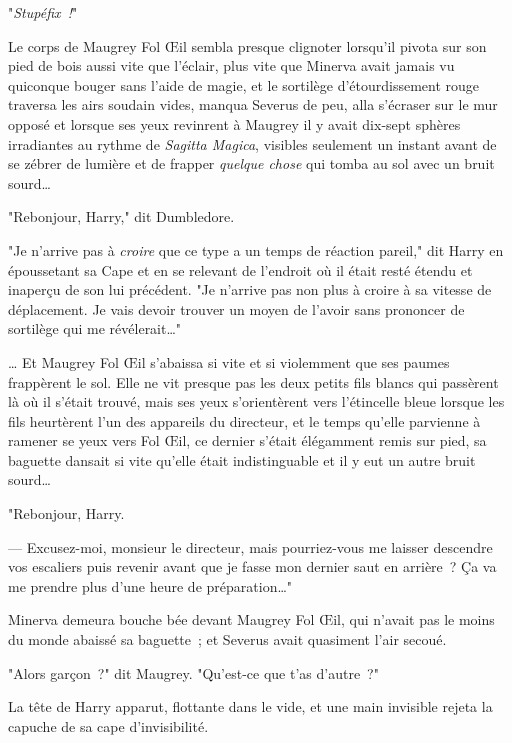 "\emph{Stupéfix~!}"

Le corps de Maugrey Fol Œil sembla presque clignoter lorsqu'il pivota sur son pied de bois aussi vite que l'éclair, plus vite que Minerva avait jamais vu quiconque bouger sans l'aide de magie, et le sortilège d'étourdissement rouge traversa les airs soudain vides, manqua Severus de peu, alla s'écraser sur le mur opposé et lorsque ses yeux revinrent à Maugrey il y avait dix-sept sphères irradiantes au rythme de \emph{Sagitta Magica}, visibles seulement un instant avant de se zébrer de lumière et de frapper \emph{quelque chose} qui tomba au sol avec un bruit sourd…

\later

"Rebonjour, Harry," dit Dumbledore.

"Je n'arrive pas à \emph{croire} que ce type a un temps de réaction pareil," dit Harry en époussetant sa Cape et en se relevant de l'endroit où il était resté étendu et inaperçu de son lui précédent. "Je n'arrive pas non plus à croire à sa vitesse de déplacement. Je vais devoir trouver un moyen de l'avoir sans prononcer de sortilège qui me révélerait…"

\later

… Et Maugrey Fol Œil s'abaissa si vite et si violemment que ses paumes frappèrent le sol. Elle ne vit presque pas les deux petits fils blancs qui passèrent là où il s'était trouvé, mais ses yeux s'orientèrent vers l'étincelle bleue lorsque les fils heurtèrent l'un des appareils du directeur, et le temps qu'elle parvienne à ramener se yeux vers Fol Œil, ce dernier s'était élégamment remis sur pied, sa baguette dansait si vite qu'elle était indistinguable et il y eut un autre bruit sourd…

\later

"Rebonjour, Harry.

--- Excusez-moi, monsieur le directeur, mais pourriez-vous me laisser descendre vos escaliers puis revenir avant que je fasse mon dernier saut en arrière~? Ça va me prendre plus d'une heure de préparation…"

\later

Minerva demeura bouche bée devant Maugrey Fol Œil, qui n'avait pas le moins du monde abaissé sa baguette~; et Severus avait quasiment l'air secoué.

"Alors garçon~?" dit Maugrey. "Qu'est-ce que t'as d'autre~?"

La tête de Harry apparut, flottante dans le vide, et une main invisible rejeta la capuche de sa cape d'invisibilité.

